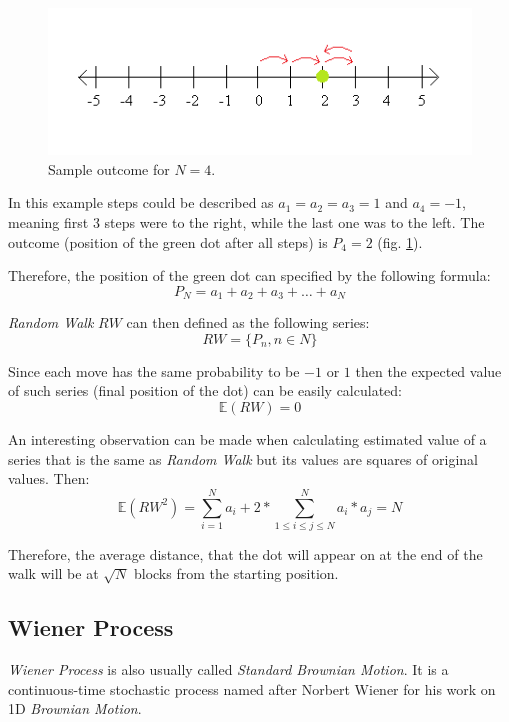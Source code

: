         \begin{figure}[H]
            \centering
            \includegraphics{img/numberLine_end.png}
            \caption{Sample outcome for $N=4$.}
            \label{fig:numberLine_end}
        \end{figure}
        
        In this example steps could be described as $a_1 = a_2 = a_3 = 1$ and $a_4 = -1$, meaning first 3 steps were to the right, while the last one was to the left. The outcome (position of the green dot after all steps) is $P_4 = 2$ (fig. \ref{fig:numberLine_end}).
        
        Therefore, the position of the green dot can specified by the following formula:
        \[  %
        P_N = a_1 + a_2 + a_3 + \ldots + a_N
        \]
        
        \textit{Random Walk} $RW$ can then defined as the following series:
        \[
        RW = \{P_n, n \in N\}
        \]
        
        Since each move has the same probability to be $-1$ or $1$ then the expected value of such series (final position of the dot) can be easily calculated:
        \[
        \mathbb{E}(RW) = 0
        \]
        
        An interesting observation can be made when calculating estimated value of a series that is the same as \textit{Random Walk} but its values are squares of original values.
        Then:
        \[
        \mathbb{E}({RW}^2) = \sum_{i=1}^{N} a_{i} + 2*\sum_{1 \leq i \leq j \leq N}^{N} a_{i}*a_{j} = N
        \]
        
        Therefore, the average distance, that the dot will appear on at the end of the walk will be at \(\sqrt{N}\) blocks from the starting position.
        
    \subsection{Wiener Process}
        \textit{Wiener Process} is also usually called \textit{Standard Brownian Motion}. It is a continuous-time stochastic process named after Norbert Wiener for his work on 1D \textit{Brownian Motion}.
        
